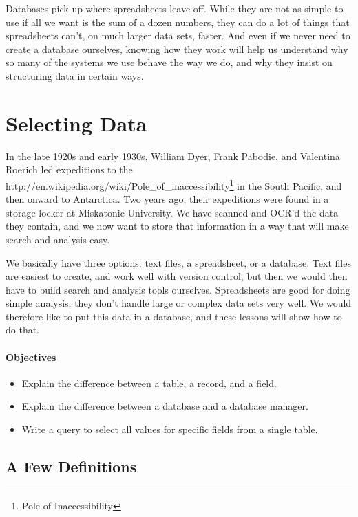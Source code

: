 \documentclass[]{book}
\newcommand{\urlfoot}[2]{{#1}\footnote{#2}}
\begin{document}
Databases pick up where spreadsheets leave off. While they are not as
simple to use if all we want is the sum of a dozen numbers, they can do
a lot of things that spreadsheets can't, on much larger data sets,
faster. And even if we never need to create a database ourselves,
knowing how they work will help us understand why so many of the systems
we use behave the way we do, and why they insist on structuring data in
certain ways.

\section{Selecting Data}

In the late 1920s and early 1930s, William Dyer, Frank Pabodie, and
Valentina Roerich led expeditions to the
\urlfoot{http://en.wikipedia.org/wiki/Pole_of_inaccessibility}{Pole of
Inaccessibility} in the South Pacific, and then onward to Antarctica.
Two years ago, their expeditions were found in a storage locker at
Miskatonic University. We have scanned and OCR'd the data they contain,
and we now want to store that information in a way that will make search
and analysis easy.

We basically have three options: text files, a spreadsheet, or a
database. Text files are easiest to create, and work well with version
control, but then we would then have to build search and analysis tools
ourselves. Spreadsheets are good for doing simple analysis, they don't
handle large or complex data sets very well. We would therefore like to
put this data in a database, and these lessons will show how to do that.

\mbox{}\paragraph{Objectives}

\begin{itemize}
\item
  Explain the difference between a table, a record, and a field.
\item
  Explain the difference between a database and a database manager.
\item
  Write a query to select all values for specific fields from a single
  table.
\end{itemize}

\subsection{A Few Definitions}
\end{document}
